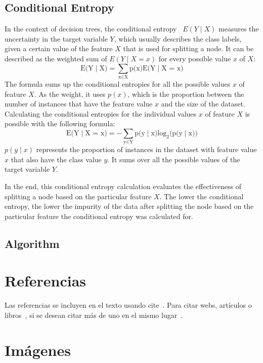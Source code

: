 \subsection{Conditional Entropy} \label{conditional_entropy}
In the context of decision trees, the conditional entropy~\cite{conditional_entropy_wiki} $E(Y\mid X)$ measures the uncertainty in the target variable $Y$, which usually describes the class labels, given a certain value of the feature $X$ that is used for splitting a node.
It can be described as the weighted sum of $E(Y\mid X = x)$ for every possible value $x$ of $X$:
\[\text{E(Y}\mid \text{X}) = \sum_{\text{x} \in \text{X}} \text{p(x)} \text{E(Y}\mid \text{X = x)}\]
The formula sums up the conditional entropies for all the possible values $x$ of feature $X$. As the weight, it uses $p(x)$, which is the proportion between the number of instances that have the feature value $x$ and the size of the dataset.
Calculating the conditional entropies for the individual values $x$ of feature $X$ is possible with the following formula:
\[ \text{E(Y}\mid \text{X = x)} = -\sum_{\text{y} \in \text{Y}} \text{p(y}\mid \text{x)} \text{log}_\text{2} \text{(p(y}\mid \text{x))} \]
$p(y\mid x)$ represents the proportion of instances in the dataset with feature value $x$ that also have the class value $y$. It sums over all the possible values of the target variable $Y$.

In the end, this conditional entropy calculation evaluates the effectiveness of splitting a node based on the particular feature $X$. The lower the conditional entropy, the lower the impurity of the data after splitting the node based on the particular feature the conditional entropy was calculated for.

\subsection{Algorithm}


\section{Referencias}

Las referencias se incluyen en el texto usando cite~\cite{wiki:latex}. Para citar webs, artículos o libros~\cite{koza92}, si se desean citar más de uno en el mismo lugar~\cite{bortolot2005, koza92}.


\section{Imágenes}

